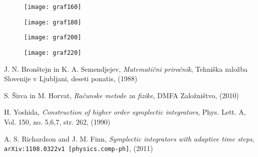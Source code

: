 \documentclass[12pt, a4paper]{article}
\begin{document}
\begin{figure}[H]\centering
	\texttt{[image: graf160]}
	\caption{}
\end{figure}

\begin{figure}[H]\centering
	\texttt{[image: graf180]}
	\caption{}
\end{figure}

\begin{figure}[H]\centering
	\texttt{[image: graf200]}
	\caption{}
\end{figure}

\begin{figure}[H]\centering
	\texttt{[image: graf220]}
	\caption{}
\end{figure}

\begin{thebibliography}{9}
		J. N. Bron\v stejn in K. A. Semendjejev,
		{\em Matemati\v cni priro\v cnik},
		Tehni\v ska zalo\v zba Slovenije v Ljubljani,
		deseti ponatis,
		(1988)

        S. \v Sirca in M. Horvat,
        {\em Ra\v cunske metode za fizike},
        DMFA Zalo\v zni\v stvo,
        (2010)

        H. Yoshida,
        \emph{Construction of higher order symplectic integrators},
        Phys. Lett. A,
        Vol. 150, no. 5,6,7, str. 262,
        (1990)

        A. S. Richardson and J. M. Finn,
        \emph{Symplectic integrators with adaptive time steps},
        {\tt arXiv:1108.0322v1 [physics.comp-ph]},
        (2011)
\end{thebibliography}
\end{document}
